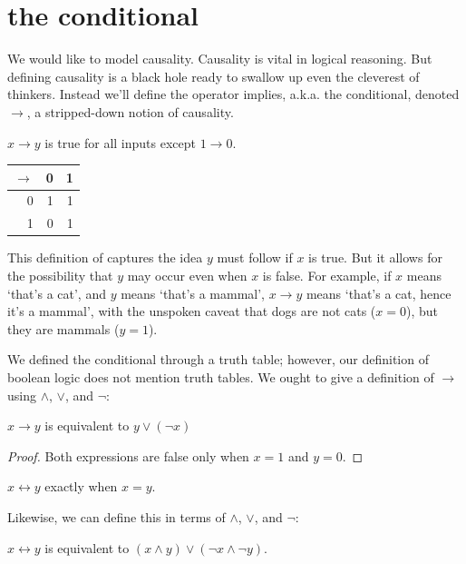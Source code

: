\documentclass{scrbook}
\renewcommand{\implies}{\to}
\renewcommand{\iff}{\leftrightarrow}
\begin{document}
\section[The Conditional]{the conditional}
We would like to model causality. Causality is vital in logical reasoning. But defining causality is a black hole ready to swallow up even the cleverest of thinkers.  Instead we'll define the operator implies, a.k.a. the conditional, denoted $\implies$, a stripped-down notion of causality. 
\begin{defn}[implies $\implies$]
  $x\implies y$ is true for all inputs except $1\implies 0$. 
\begin{center}  
\begin{tabular}{r|rr}
$\implies$ & 0 & 1 \\
\hline
0 & 1 & 1 \\
1 & 0 & 1 \\
\end{tabular}
\end{center}
\end{defn}
This definition of captures the idea $y$ must follow if $x$ is true. But it allows for the possibility that $y$ may occur even when $x$ is false. For example, if $x$ means `that's a cat', and $y$ means `that's a mammal', $x\implies y$ means `that's a cat, hence it's a mammal', with the unspoken caveat that dogs are not cats ($x=0$), but they are mammals ($y=1$). 

We defined the conditional through a truth table; however, our definition of boolean logic does not mention truth tables. We ought to give a definition of $\implies$ using $\wedge$, $\vee$, and $\neg$:
\begin{theorem}
  $x\implies y$ is equivalent to $y \vee (\neg x)$
\end{theorem}
\begin{proof}
  Both expressions are false only when $x=1$ and $y=0$. 
\end{proof}

\begin{defn}[logical equivalence $\iff$]
  $x\iff y$ exactly when $x = y$. 
\end{defn}
Likewise, we can define this in terms of $\wedge$, $\vee$, and $\neg$:
\begin{theorem}
  $x\iff y$ is equivalent to $(x \wedge y) \vee (\neg x \wedge \neg y)$. 
\end{theorem}
\end{document}
